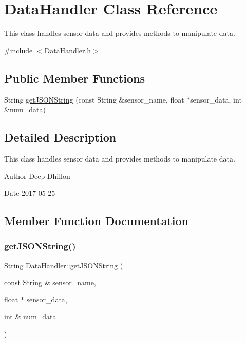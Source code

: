 \hypertarget{class_data_handler}{}\section{Data\+Handler Class Reference}
\label{class_data_handler}


This class handles sensor data and provides methods to manipulate data.  




{\ttfamily \#include $<$Data\+Handler.\+h$>$}

\subsection*{Public Member Functions}
\begin{DoxyCompactItemize}
\item 
String \hyperlink{class_data_handler_aba4458dfab49740deb19a983e654e2ef}{get\+J\+S\+O\+N\+String} (const String \&sensor\+\_\+name, float $\ast$sensor\+\_\+data, int \&num\+\_\+data)
\end{DoxyCompactItemize}


\subsection{Detailed Description}
This class handles sensor data and provides methods to manipulate data. 

\begin{DoxyAuthor}{Author}
Deep Dhillon 
\end{DoxyAuthor}
\begin{DoxyDate}{Date}
2017-\/05-\/25 
\end{DoxyDate}


\subsection{Member Function Documentation}
\mbox{\label{class_data_handler_aba4458dfab49740deb19a983e654e2ef}} 
\subsubsection{\texorpdfstring{get\+J\+S\+O\+N\+String()}{getJSONString()}}
{\footnotesize\ttfamily String Data\+Handler\+::get\+J\+S\+O\+N\+String (\begin{DoxyParamCaption}\item[{const String \&}]{sensor\+\_\+name,  }\item[{float $\ast$}]{sensor\+\_\+data,  }\item[{int \&}]{num\+\_\+data }\end{DoxyParamCaption})}

